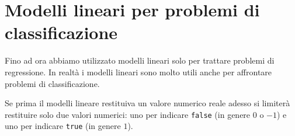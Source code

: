 \chapter{Modelli lineari per problemi di classificazione}
Fino ad ora abbiamo utilizzato modelli lineari solo per trattare problemi di regressione. In realt\`a i modelli lineari
sono molto utili anche per affrontare problemi di classificazione.

Se prima il modelli lineare restituiva un valore numerico reale adesso si limiter\`a restituire solo due valori numerici:
uno per indicare \verb|false| (in genere $0$ o $-1$) e uno per indicare \verb|true| (in genere $1$).